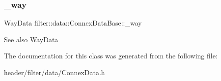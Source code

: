 \subsubsection{\texorpdfstring{\+\_\+way}{\_way}}
{\footnotesize\ttfamily Way\+Data filter\+::data\+::\+Connex\+Data\+Base\+::\+\_\+way\hspace{0.3cm}{\ttfamily [protected]}}

\begin{DoxySeeAlso}{See also}
Way\+Data 
\end{DoxySeeAlso}


The documentation for this class was generated from the following file\+:\begin{DoxyCompactItemize}
\item 
header/filter/data/Connex\+Data.\+h\end{DoxyCompactItemize}
